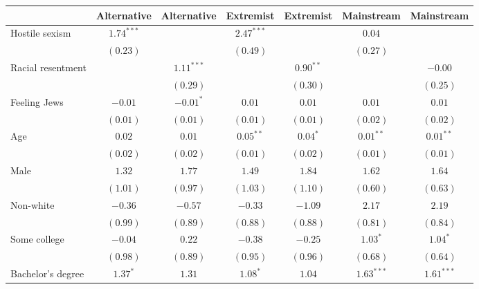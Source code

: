 
\usepackage{booktabs}

\begin{table}
\begin{center}
\begin{tabular}{l c c c c c c}
\toprule
 & Alternative & Alternative & Extremist & Extremist & Mainstream & Mainstream \\
\midrule
Hostile sexism    & $1.74^{***}$ &              & $2.47^{***}$ &             & $0.04$       &              \\
                  & $(0.23)$     &              & $(0.49)$     &             & $(0.27)$     &              \\
Racial resentment &              & $1.11^{***}$ &              & $0.90^{**}$ &              & $-0.00$      \\
                  &              & $(0.29)$     &              & $(0.30)$    &              & $(0.25)$     \\
Feeling Jews      & $-0.01$      & $-0.01^{*}$  & $0.01$       & $0.01$      & $0.01$       & $0.01$       \\
                  & $(0.01)$     & $(0.01)$     & $(0.01)$     & $(0.01)$    & $(0.02)$     & $(0.02)$     \\
Age               & $0.02$       & $0.01$       & $0.05^{**}$  & $0.04^{*}$  & $0.01^{**}$  & $0.01^{**}$  \\
                  & $(0.02)$     & $(0.02)$     & $(0.01)$     & $(0.02)$    & $(0.01)$     & $(0.01)$     \\
Male              & $1.32$       & $1.77$       & $1.49$       & $1.84$      & $1.62$       & $1.64$       \\
                  & $(1.01)$     & $(0.97)$     & $(1.03)$     & $(1.10)$    & $(0.60)$     & $(0.63)$     \\
Non-white         & $-0.36$      & $-0.57$      & $-0.33$      & $-1.09$     & $2.17$       & $2.19$       \\
                  & $(0.99)$     & $(0.89)$     & $(0.88)$     & $(0.88)$    & $(0.81)$     & $(0.84)$     \\
Some college      & $-0.04$      & $0.22$       & $-0.38$      & $-0.25$     & $1.03^{*}$   & $1.04^{*}$   \\
                  & $(0.98)$     & $(0.89)$     & $(0.95)$     & $(0.96)$    & $(0.68)$     & $(0.64)$     \\
Bachelor's degree & $1.37^{*}$   & $1.31$       & $1.08^{*}$   & $1.04$      & $1.63^{***}$ & $1.61^{***}$ \\

\end{tabular}
\end{center}
\end{table}
